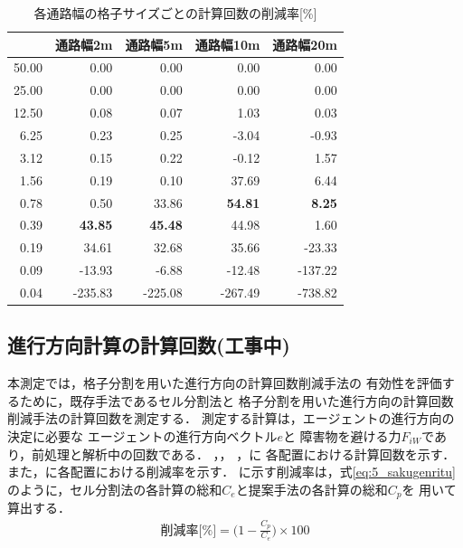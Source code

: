 \begin{table}[tb]
  \centering
  \caption{各通路幅の格子サイズごとの計算回数の削減率[\%]}
  \label{tb:5_times_sakugenritu}
    \begin{tabular}{r|r|r|r|r}
    \hline \hline
              & 通路幅2m       & 通路幅5m       & 通路幅10m      & 通路幅20m     \\ \hline
        50.00 & 0.00           & 0.00           & 0.00           & 0.00          \\ \hline
        25.00 & 0.00           & 0.00           & 0.00           & 0.00          \\ \hline
        12.50 & 0.08           & 0.07           & 1.03           & 0.03          \\ \hline
        6.25  & 0.23           & 0.25           & -3.04          & -0.93         \\ \hline
        3.12  & 0.15           & 0.22           & -0.12          & 1.57          \\ \hline
        1.56  & 0.19           & 0.10           & 37.69          & 6.44          \\ \hline
        0.78  & 0.50           & 33.86          & \textbf{54.81} & \textbf{8.25} \\ \hline
        0.39  & \textbf{43.85} & \textbf{45.48} & 44.98          & 1.60          \\ \hline
        0.19  & 34.61          & 32.68          & 35.66          & -23.33        \\ \hline
        0.09  & -13.93         & -6.88          & -12.48         & -137.22       \\ \hline
        0.04  & -235.83        & -225.08        & -267.49        & -738.82       \\ \hline
    \end{tabular}
\end{table}

\subsection{進行方向計算の計算回数(工事中)}
\label{sec:5_calc_times}
本測定では，格子分割を用いた進行方向の計算回数削減手法の
有効性を評価するために，既存手法であるセル分割法と
格子分割を用いた進行方向の計算回数削減手法の計算回数を測定する．
測定する計算は，エージェントの進行方向の決定に必要な
エージェントの進行方向ベクトル$e$と
障害物を避ける力$F_{iW}$であり，前処理と解析中の回数である．
，，
，に
各配置における計算回数を示す．
また，に各配置における削減率を示す．
に示す削減率は，式\eqref{eq:5_sakugenritu}
のように，セル分割法の各計算の総和$C_e$と提案手法の各計算の総和$C_p$を
用いて算出する．
%
\begin{eqnarray}
\mbox{削減率[\%]} = \Big ( 1 - \frac{C_p}{C_e}  \Big) \times 100
\label{eq:5_sakugenritu}
\end{eqnarray}
%

